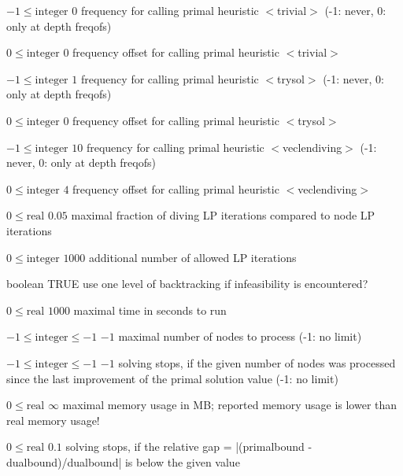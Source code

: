 %
{$-1\leq\textrm{integer}$}%
{$0$}%
{frequency for calling primal heuristic $<$trivial$>$ (-1: never, 0: only at depth freqofs)}%
{}

%
{$0\leq\textrm{integer}$}%
{$0$}%
{frequency offset for calling primal heuristic $<$trivial$>$}%
{}

%
{$-1\leq\textrm{integer}$}%
{$1$}%
{frequency for calling primal heuristic $<$trysol$>$ (-1: never, 0: only at depth freqofs)}%
{}

%
{$0\leq\textrm{integer}$}%
{$0$}%
{frequency offset for calling primal heuristic $<$trysol$>$}%
{}

%
{$-1\leq\textrm{integer}$}%
{$10$}%
{frequency for calling primal heuristic $<$veclendiving$>$ (-1: never, 0: only at depth freqofs)}%
{}

%
{$0\leq\textrm{integer}$}%
{$4$}%
{frequency offset for calling primal heuristic $<$veclendiving$>$}%
{}

%
{$0\leq\textrm{real}$}%
{$0.05$}%
{maximal fraction of diving LP iterations compared to node LP iterations}%
{}

%
{$0\leq\textrm{integer}$}%
{$1000$}%
{additional number of allowed LP iterations}%
{}

%
{boolean}%
{TRUE}%
{use one level of backtracking if infeasibility is encountered?}%
{}

%
{$0\leq\textrm{real}$}%
{$1000$}%
{maximal time in seconds to run}%
{}

%
{$-1\leq\textrm{integer}\leq-1$}%
{$-1$}%
{maximal number of nodes to process (-1: no limit)}%
{}

%
{$-1\leq\textrm{integer}\leq-1$}%
{$-1$}%
{solving stops, if the given number of nodes was processed since the last improvement of the primal solution value (-1: no limit)}%
{}

%
{$0\leq\textrm{real}$}%
{$\infty$}%
{maximal memory usage in MB; reported memory usage is lower than real memory usage!}%
{}

%
{$0\leq\textrm{real}$}%
{$0.1$}%
{solving stops, if the relative gap = |(primalbound - dualbound)/dualbound| is below the given value}%
{}

